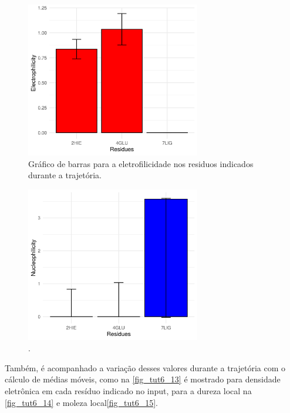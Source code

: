 \documentclass[a4paper,11pt]{refart}
\begin{document}
\hspace*{-\leftmarginwidth}
\begin{minipage}{\fullwidth}
	\begin{figure}[H]
		\begin{center}
			\includegraphics[width=3in]{images/tut6_img12}
			\caption{Gráfico de barras para a eletrofilicidade nos residuos indicados durante a trajetória.}
			\label{fig_tut6_11}
		\end{center}
	\end{figure}
\end{minipage}


\hspace*{-\leftmarginwidth}
\begin{minipage}{\fullwidth}
	\begin{figure}[H]
		\begin{center}
			\includegraphics[width=3in]{images/tut6_img13}
			\caption{.}
			\label{fig_tut6_12}
		\end{center}
	\end{figure}
\end{minipage}


Também, é acompanhado a variação desses valores durante a trajetória com o cálculo de médias móveis, como na \autoref{fig_tut6_13} é mostrado para densidade eletrônica em cada resíduo indicado no input, para a dureza local na \autoref{fig_tut6_14} e moleza local\autoref{fig_tut6_15}. 
\end{document}
